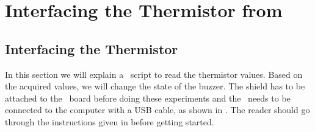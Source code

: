 \section{Interfacing the Thermistor from \scilab}
\subsection{Interfacing the Thermistor}
In this section we will explain a \scilab\ script to read the thermistor
values. Based on the acquired values, we will change
the state of the buzzer.  The shield has to be attached to the \arduino\ board
before doing these experiments and the \arduino\ needs to be connected to the computer
with a USB cable, as shown in .
The reader should go through the instructions given in
 before getting started.


